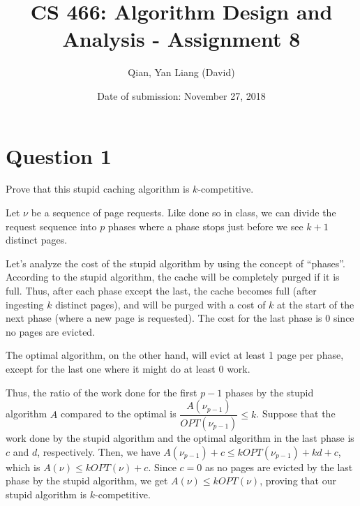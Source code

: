 \documentclass{article}
\title{CS 466: Algorithm Design and Analysis - Assignment 8}
\author{Qian, Yan Liang (David)}
\date{Date of submission: November 27, 2018}
\begin{document}
\newpage

\section{Question 1}

Prove that this stupid caching algorithm is $k$-competitive.

Let $\nu$ be a sequence of page requests. Like done so in class, we can divide the request sequence into $p$ phases
where a phase stops just before we see $k + 1$ distinct pages.

Let's analyze the cost of the stupid algorithm by using the concept of ``phases''. According to the stupid algorithm,
the cache will be completely purged if it is full. Thus, after each phase except the last, the cache becomes full (after
ingesting $k$ distinct pages), and will be purged with a cost of $k$ at the start of the next phase (where a new page is
requested). The cost for the last phase is 0 since no pages are evicted.

The optimal algorithm, on the other hand, will evict at least 1 page per phase, except for the last one where it might
do at least 0 work.

Thus, the ratio of the work done for the first $p - 1$ phases by the stupid algorithm $A$ compared to the optimal
is $\dfrac{A(\nu_{p-1})}{OPT(\nu_{p-1})} \leq k$. Suppose that the work done by the stupid algorithm and the optimal
algorithm in the last phase is $c$ and $d$, respectively. Then, we have $A(\nu_{p -1}) + c \leq k OPT(\nu_{p-1}) + kd +
c$, which is $A(\nu) \leq k OPT(\nu) + c$. Since $c = 0$ as no pages are evicted by the last phase by
the stupid algorithm, we get $A(\nu) \leq k OPT(\nu)$, proving that our stupid algorithm is $k$-competitive.
\end{document}

